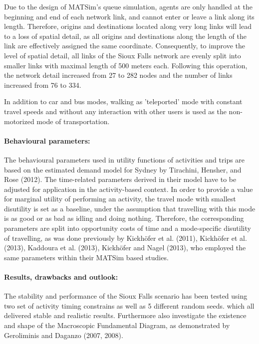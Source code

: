 Due to the design of MATSim’s queue simulation, agents are only handled at the beginning and end of each network link, and cannot enter or leave a link along its length. Therefore, origins and destinations located along very long links will lead to a loss of spatial detail, as all origins and destinations along the length of the link are effectively assigned the same coordinate. Consequently, to improve the level of spatial detail, all links of the Sioux Falls network are evenly split into smaller links with maximal length of 500 meters each. Following this operation, the network detail increased from 27 to 282 nodes and the number of links increased from 76 to 334.

In addition to car and bus modes, walking as 'teleported' mode with constant travel speeds and without any interaction with other users is used as the non-motorized mode of transportation. 

\paragraph{Behavioural parameters:}

The behavioural parameters used in utility functions of activities and trips are based on the estimated demand model for Sydney by Tirachini, Hensher, and Rose (2012). The time-related parameters derived in their model have to be adjusted for application in the activity-based context. In order to provide a value for marginal utility of performing an activity, the travel mode with smallest disutility is set as a baseline, under the assumption that travelling with this mode is as good or as bad as idling and doing nothing. Therefore, the corresponding parameters are split into opportunity costs of time and a mode-specific disutility of travelling, as was done previously by Kickhöfer et al. (2011), Kickhöfer et al. (2013), Kaddoura et al. (2013), Kickhöfer and Nagel (2013), who employed the same parameters within their MATSim based studies. 

\paragraph{Results, drawbacks and outlook:}

The stability and performance of the Sioux Falls scenario has been tested using two set of activity timing constrains as well as 5 different random seeds. which all delivered stable and realistic results. Furthermore \citet[][]{ChakirovFourie_TechRep_FCL_2014} also investigate the existence and shape of the Macroscopic Fundamental Diagram, as demonstrated by Geroliminis and Daganzo (2007, 2008). 

